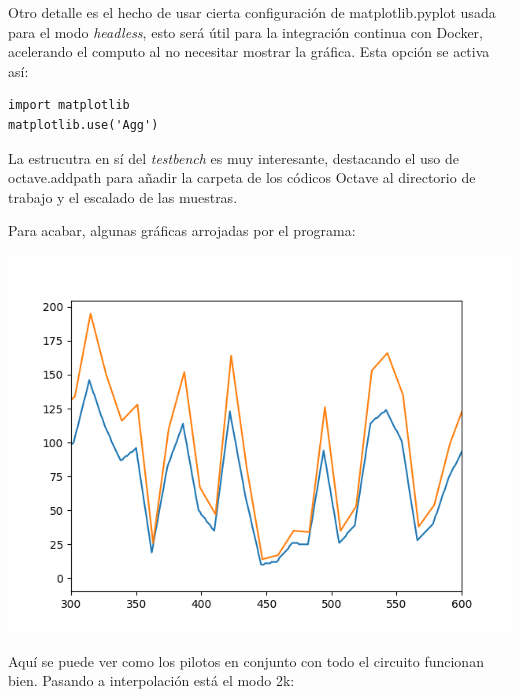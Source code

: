 \documentclass[11pt]{scrartcl} %
\begin{document}
\begin{preview}
Otro detalle es el hecho de usar cierta configuración de matplotlib.pyplot usada para el modo \emph{headless}, esto será útil para la integración continua con Docker, acelerando el computo al no necesitar mostrar la gráfica. Esta opción se activa así:

\begin{verbatim}
import matplotlib
matplotlib.use('Agg')
\end{verbatim}

La estrucutra en sí del \emph{testbench} es muy interesante, destacando el uso de octave.addpath para añadir la carpeta de los códicos Octave al directorio de trabajo y el escalado de las muestras.

Para acabar, algunas gráficas arrojadas por el programa:

\begin{minipage}{\linewidth}
	\begin{center}
		\includegraphics[width=1\columnwidth,trim={0 0.5cm 1cm 0.5cm},clip]{../../Linux/Trabajo/TopLevelCCTb/imgs/pilotos.png} %
	\end{center}
	\label{pilotosveriftoplevel}
\end{minipage}

Aquí se puede ver como los pilotos en conjunto con todo el circuito funcionan bien. Pasando a interpolación está el modo 2k:


\end{preview}
\end{document}
